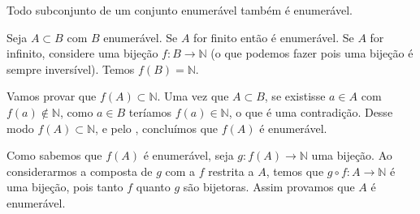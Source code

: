 \documentclass[../main.tex]{subfiles}
\begin{document}
\begin{teo}\label{enum-teo-subconjuntoConjuntoEnumeravelEnumeravel}
    Todo subconjunto de um conjunto enumerável também é enumerável.
\end{teo}
\begin{dem}
    Seja $A \subset B$ com $B$ enumerável. Se $A$ for finito então é enumerável. Se $A$ for infinito, considere uma bijeção $f \colon B \to \mathbb{N}$ (o que podemos fazer pois uma bijeção é sempre inversível). Temos $f(B) = \mathbb{N}$. 

    Vamos provar que $f(A) \subset \mathbb{N}$. Uma vez que $A \subset B$, se existisse $a \in A$ com $f(a) \not\in \mathbb{N}$, como
    $a \in B$ teríamos $f(a) \in \mathbb{N}$, o que é uma contradição. Desse modo $f(A) \subset \mathbb{N}$, e pelo , concluímos que $f(A)$ é enumerável.

    Como sabemos que $f(A)$ é enumerável, seja $g \colon f(A) \to \mathbb{N}$ uma bijeção. Ao considerarmos a composta de $g$ com a $f$ restrita a $A$, temos que $g \circ f \colon A \to \mathbb{N}$ é uma bijeção, pois tanto $f$ quanto $g$ são bijetoras. Assim provamos que $A$ é enumerável.
\end{dem}

    
        
\end{document}
